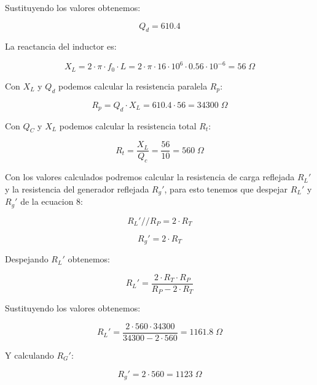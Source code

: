 Sustituyendo los valores obtenemos:

\begin{equation}
    Q_d = 610.4 
\end{equation}

La reactancia del inductor es:

\begin{equation}
    X_L = 2 \cdot \pi \cdot f_0 \cdot L = 2 \cdot \pi \cdot 16 \cdot 10^6 \cdot 0.56 \cdot 10^{-6} = 56\; \Omega
\end{equation}

Con $X_L$ y $Q_d$ podemos calcular la resistencia paralela $R_p$:

\begin{equation}
    R_p = Q_d \cdot X_L = 610.4 \cdot 56 = 34300\; \Omega
\end{equation}

Con $Q_C$ y $X_L$ podemos calcular la resistencia total $R_t$:

\begin{equation}
    R_t = \frac{X_L}{Q_c} = \frac{56}{10} = 560\; \Omega
\end{equation}

Con los valores calculados podremos calcular la resistencia de carga reflejada $R_L'$ y la resistencia del generador reflejada $R_g'$, para esto tenemos que despejar $R_L'$ y $R_g'$ de la ecuacion 8:

\begin{equation}
    R_L' // R_P = 2 \cdot R_T 
\end{equation}

\begin{equation}
    R_g' = 2 \cdot R_T 
\end{equation}

Despejando $R_L'$ obtenemos:

\begin{equation}
    R_L' = \frac{2 \cdot R_T \cdot R_P}{R_P - 2 \cdot R_T} 
\end{equation}

Sustituyendo los valores obtenemos:

\begin{equation}
    R_L' = \frac{2 \cdot 560 \cdot 34300}{34300 - 2 \cdot 560} = 1161.8\; \Omega
\end{equation}

Y calculando $R_G'$:

\begin{equation}
    R_g' = 2 \cdot 560 = 1123\; \Omega
\end{equation}


